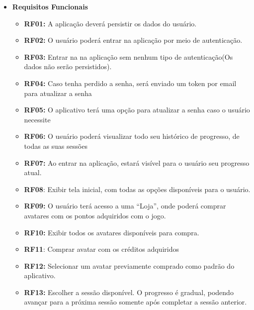 \begin{itemize}
    \item \textbf{Requisitos Funcionais}
    \begin{itemize}
        \item \textbf{RF01:} A aplicação deverá persistir os dados do usuário.

        \item \textbf{RF02:} O usuário poderá entrar na aplicação por meio de autenticação.

        \item \textbf{RF03:} Entrar na na aplicação sem nenhum tipo de autenticação(Os dados não serão persistidos).

        \item \textbf{RF04:} Caso tenha perdido a senha, será enviado um token por email para atualizar a senha

        \item \textbf{RF05:} O aplicativo terá uma opção para atualizar a senha caso o usuário necessite

        \item \textbf{RF06:} O usuário poderá visualizar todo seu histórico de progresso, de todas as suas sessões

        \item \textbf{RF07:} Ao entrar na aplicação, estará visível para o usuário seu progresso atual.

        \item \textbf{RF08}: Exibir tela inicial, com todas as opções disponíveis para o usuário.

        \item \textbf{RF09:} O usuário terá acesso a uma “Loja”, onde poderá comprar avatares com os pontos adquiridos com o jogo.

        \item \textbf{RF10:} Exibir todos os avatares disponíveis para compra.

        \item \textbf{RF11}: Comprar avatar com os créditos adquiridos

        \item \textbf{RF12:} Selecionar um avatar previamente comprado como padrão do aplicativo.

        \item \textbf{RF13:} Escolher a sessão disponível. O progresso é gradual, podendo avançar para a próxima sessão somente após completar a sessão anterior.


\end{itemize}
\end{itemize}
